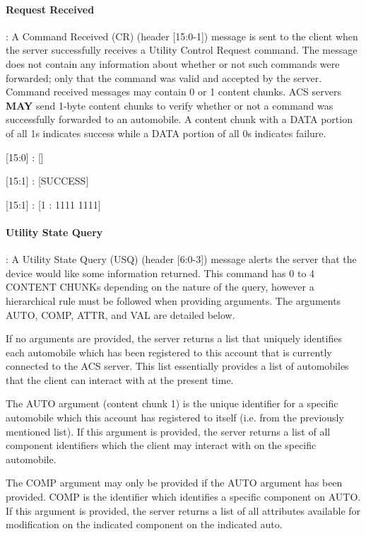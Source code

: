 \paragraph{Request Received}: A Command Received (CR) (header [15:0-1]) message is sent to the client when the server successfully receives a Utility Control Request command. The message does not contain any information
about whether or not such commands were forwarded; only that the command was valid and accepted by the server. Command received messages may contain 0 or 1 content chunks. ACS servers \textbf{MAY} send 1-byte content chunks to verify whether or not a command was successfully forwarded to an automobile. A content chunk with a DATA portion of all 1s indicates success while a DATA portion of all 0s indicates failure.

\begin{center}
{\textsf{[15:0] : []}}

{\textsf{[15:1] : [SUCCESS]}}

{\textsf{[15:1] : [1 : 1111 1111]}}
\end{center}

\paragraph{Utility State Query}: A Utility State Query (USQ) (header [6:0-3]) message alerts the server that the device would like some information returned. This command has 0 to 4 CONTENT CHUNKs depending on the nature of the query, however a hierarchical rule must be followed when providing arguments. The arguments AUTO, COMP, ATTR, and VAL are detailed below.

If no arguments are provided, the server returns a list that uniquely identifies each automobile which has been registered to this account that is currently connected to the ACS server.  This list essentially provides a list of automobiles that the client can interact with at the present time.

The AUTO argument (content chunk 1) is the unique identifier for a specific automobile which this account has registered to itself (i.e. from the previously mentioned list). If this argument is provided, the server returns a list of all component identifiers which the client may interact with on the specific automobile.

The COMP argument may only be provided if the AUTO argument has been provided. COMP is the identifier which identifies a specific component on AUTO. If this argument is provided, the server returns a list of all attributes available for modification on the indicated component on the indicated auto.

